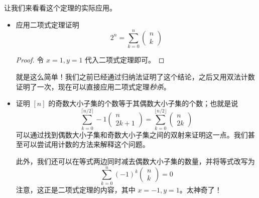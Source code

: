 \begin{example}
    让我们来看看这个定理的实际应用。

    \begin{itemize}
        \item 应用二项式定理证明
              \[2^n = \sum_{k=0}^{n}\begin{pmatrix}n\\k\end{pmatrix}\]
              \begin{proof}
                  令 $x=1, y=1$ 代入二项式定理即可。
              \end{proof}
              就是这么简单！我们之前已经通过归纳法证明了这个结论，之后又用双法计数证明了一次，现在可以直接应用二项式定理\emph{秒杀}。
        \item 证明 $[n]$ 的奇数大小子集的个数等于其偶数大小子集的个数；也就是说
              \[\sum_{k=0}^{\lceil n/2 \rceil}-1 \begin{pmatrix}n\\2k+1\end{pmatrix} = \sum_{k=0}^{\lfloor n/2 \rfloor} \begin{pmatrix}n\\2k\end{pmatrix}\]
              可以通过找到偶数大小子集和奇数大小子集之间的双射来证明这一点。我们甚至可以尝试用计数的方法来解释这个问题。

              此外，我们还可以在等式两边同时减去偶数大小子集的数量，并将等式改写为
              \[\sum_{k=0}^{n}(-1)^k\begin{pmatrix}n\\k\end{pmatrix}=0\]
              注意，这正是二项式定理的内容，其中 $x = -1, y = 1$。太神奇了！
    \end{itemize}
\end{example}